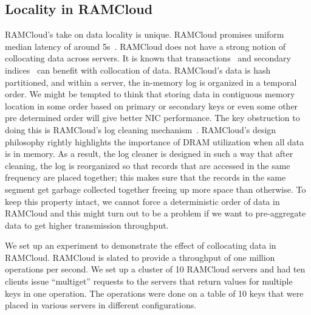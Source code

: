 \subsection{Locality in RAMCloud}
RAMCloud's take on data locality is unique. RAMCloud promises uniform median latency of around 5\textmu s~\cite{ramcloud}. RAMCloud does not have a strong notion of collocating data across servers. 
It is known that transactions~\cite{ramcloudtx} and secondary indices~\cite{slik} can benefit with collocation of data. RAMCloud's data is hash partitioned, and within a server, the in-memory log is organized 
in a temporal order. We might be tempted to think that storing data in contiguous memory location in some order based on primary or secondary keys or even some other pre determined order will give better NIC performance. 
The key obstruction to doing this is RAMCloud's log cleaning mechanism~\cite{ramcloudfast}. RAMCloud's design philosophy rightly highlights the importance of DRAM utilization when all data is in memory. 
As a result, the log cleaner is designed in such a way that after cleaning, the log is reorganized so that records that are accessed in the same frequency are placed together; this makes sure that the records in the same 
segment get garbage collected together freeing up more space than otherwise. To keep this property intact, we cannot force a deterministic order of data in RAMCloud and this might turn out to be a problem if 
we want to pre-aggregate data to get higher transmission throughput.

We set up an experiment to demonstrate the effect of collocating data in RAMCloud. RAMCloud is slated to provide a throughput of one million operations per second. We set up a cluster of 10 RAMCloud servers 
and had ten clients issue ``multiget'' requests to the servers that return values for multiple keys in one operation. The operations were done on a table of 10 keys that were placed in various servers in different 
configurations. 

